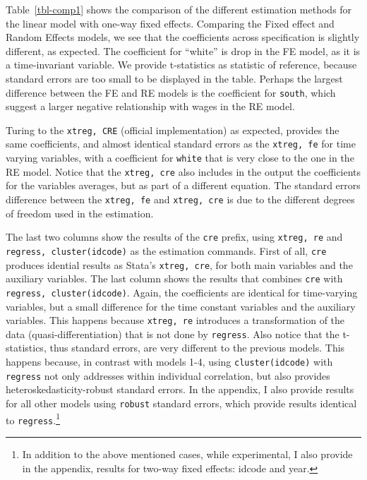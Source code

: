 \documentclass[bib]{statapress}
\begin{document}
Table~\ref{tbl-comp1} shows the comparison of the different estimation
methods for the linear model with one-way fixed effects. Comparing the
Fixed effect and Random Effects models, we see that the coefficients
across specification is slightly different, as expected. The coefficient
for ``white'' is drop in the FE model, as it is a time-invariant
variable. We provide t-statistics as statistic of reference, because
standard errors are too small to be displayed in the table. Perhaps the
largest difference between the FE and RE models is the coefficient for
\texttt{south}, which suggest a larger negative relationship with wages
in the RE model.

Turing to the \texttt{xtreg,\ CRE} (official implementation) as
expected, provides the same coefficients, and almost identical standard
errors as the \texttt{xtreg,\ fe} for time varying variables, with a
coefficient for \texttt{white} that is very close to the one in the RE
model. Notice that the \texttt{xtreg,\ cre} also includes in the output
the coefficients for the variables averages, but as part of a different
equation. The standard errors difference between the \texttt{xtreg,\ fe}
and \texttt{xtreg,\ cre} is due to the different degrees of freedom used
in the estimation.

The last two columns show the results of the \texttt{cre} prefix, using
\texttt{xtreg,\ re} and \texttt{regress,\ cluster(idcode)} as the
estimation commands. First of all, \texttt{cre} produces idential
results as Stata's \texttt{xtreg,\ cre}, for both main variables and the
auxiliary variables. The last column shows the results that combines
\texttt{cre} with \texttt{regress,\ cluster(idcode)}. Again, the
coefficients are identical for time-varying variables, but a small
difference for the time constant variables and the auxiliary variables.
This happens because \texttt{xtreg,\ re} introduces a transformation of
the data (quasi-differentiation) that is not done by \texttt{regress}.
Also notice that the t-statistics, thus standard errors, are very
different to the previous models. This happens because, in contrast with
models 1-4, using \texttt{cluster(idcode)} with \texttt{regress} not
only addresses within individual correlation, but also provides
heteroskedasticity-robust standard errors. In the appendix, I also
provide results for all other models using \texttt{robust} standard
errors, which provide results identical to \texttt{regress}.\footnote{In
  addition to the above mentioned cases, while experimental, I also
  provide in the appendix, results for two-way fixed effects: idcode and
  year.}
\end{document}
